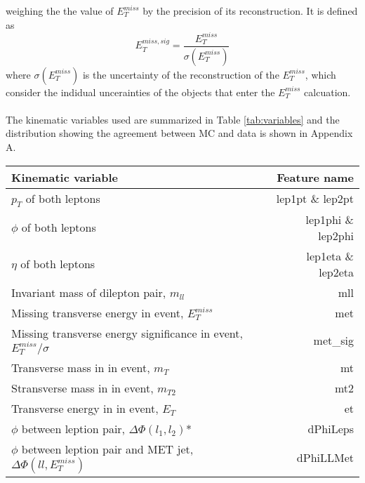 \documentclass[14pt, a4paper]{book}
\begin{document}
weighing the the value of $E_T^{miss}$ by the precision of its reconstruction. It is defined as
\begin{equation}\label{eq:METsig}
    E_T^{miss,sig} = \frac{E_T^{miss}}{\sigma(E_T^{miss})}
\end{equation}
where $\sigma(E_T^{miss})$ is the uncertainty of the reconstruction of the $E_T^{miss}$, which consider the indidual uncerainties of the objects that enter the $E_T^{miss}$ calcuation.\\
\\The kinematic variables used are summarized in Table \ref{tab:variables} and the distribution showing the agreement between MC and data is shown in Appendix A.
\begin{table}[!h]
    \centering
    \begin{tabular}{l|r}\midrule\midrule
        Kinematic variable                                                              & Feature name          \\\midrule
        $p_T$ of both leptons                                                           & lep1pt \& lep2pt      \\
        $\phi$ of both leptons                                                          & lep1phi \& lep2phi    \\
        $\eta$ of both leptons                                                          & lep1eta \& lep2eta    \\
        Invariant mass of dilepton pair, $m_{ll}$                                       & mll \\
        Missing transverse energy in event, $E_T^{miss}$                                & met \\
        Missing transverse energy significance in event, $E_T^{miss}/\sigma$            & met\_sig \\
        Transverse mass in in event, $m_T$                                              & mt \\
        Stransverse mass in in event, $m_{T2}$                                          & mt2\\
        Transverse energy in in event, $E_T$                                            & et \\
        $\phi$ between leption pair, $\Delta\Phi(l_1,l_2)$*                             & dPhiLeps \\
        $\phi$ between leption pair and MET jet, $\Delta\Phi(ll,E_T^{miss})$            & dPhiLLMet \\

\end{tabular}
\end{table}
\end{document}
